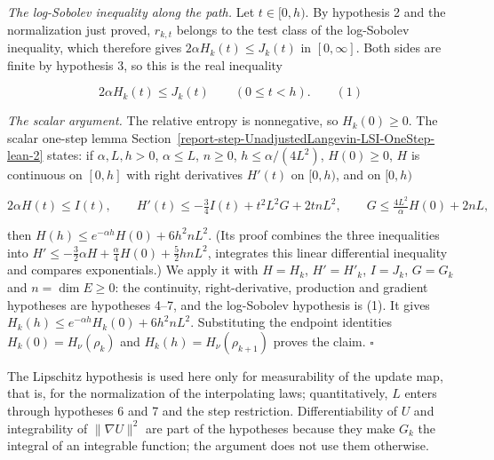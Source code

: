\documentclass[11pt,a4paper]{report}
\begin{document}
\emph{The log-Sobolev inequality along the path.} Let \(t\in[0,h)\). By hypothesis 2 and the normalization just proved, \(r_{k,t}\) belongs to the test class of the log-Sobolev inequality, which therefore gives \(2\alpha H_k(t)\le J_k(t)\) in \([0,\infty]\). Both sides are finite by hypothesis 3, so this is the real inequality


\[2\alpha H_k(t)\le J_k(t)\qquad(0\le t<h).\qquad(1)\]


\emph{The scalar argument.} The relative entropy is nonnegative, so \(H_k(0)\ge0\). The scalar one-step lemma Section~\ref{report-step-UnadjustedLangevin-LSI-OneStep-lean-2} states: if \(\alpha,L,h>0\), \(\alpha\le L\), \(n\ge0\), \(h\le\alpha/(4L^2)\), \(H(0)\ge0\), \(H\) is continuous on \([0,h]\) with right derivatives \(H'(t)\) on \([0,h)\), and on \([0,h)\)


\[2\alpha H(t)\le I(t),\qquad H'(t)\le-\tfrac34I(t)+t^2L^2G+2tnL^2,\qquad G\le\tfrac{4L^2}{\alpha}H(0)+2nL,\]


then \(H(h)\le e^{-\alpha h}H(0)+6h^2nL^2\). (Its proof combines the three inequalities into \(H'\le-\frac32\alpha H+\frac\alpha4H(0)+\frac52hnL^2\), integrates this linear differential inequality and compares exponentials.) We apply it with \(H=H_k\), \(H'=H'_k\), \(I=J_k\), \(G=G_k\) and \(n=\dim E\ge0\): the continuity, right-derivative, production and gradient hypotheses are hypotheses 4–7, and the log-Sobolev hypothesis is (1). It gives \(H_k(h)\le e^{-\alpha h}H_k(0)+6h^2nL^2\). Substituting the endpoint identities \(H_k(0)=H_\nu(\rho_k)\) and \(H_k(h)=H_\nu(\rho_{k+1})\) proves the claim. \(\square\)




The Lipschitz hypothesis is used here only for measurability of the update map, that is, for the normalization of the interpolating laws; quantitatively, \(L\) enters through hypotheses 6 and 7 and the step restriction. Differentiability of \(U\) and integrability of \(\|\nabla U\|^2\) are part of the hypotheses because they make \(G_k\) the integral of an integrable function; the argument does not use them otherwise.
\end{document}
